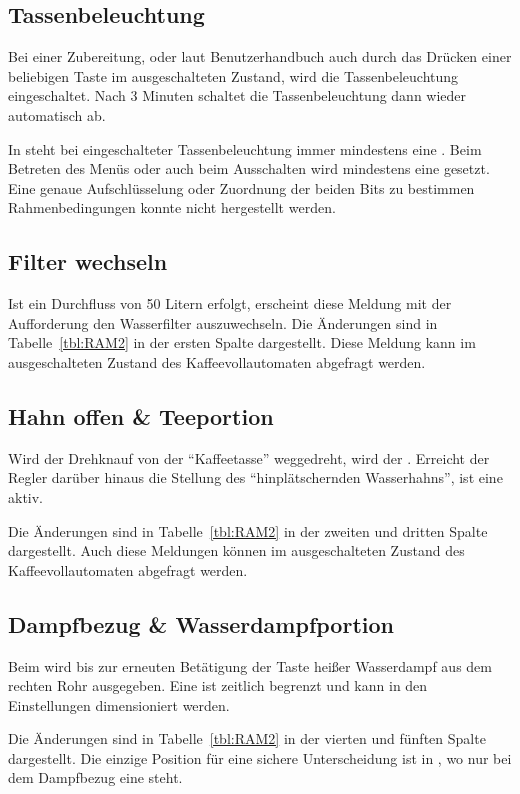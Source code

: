 \subsection{Tassenbeleuchtung}
Bei einer Zubereitung, oder laut Benutzerhandbuch auch durch das Drücken einer beliebigen Taste im ausgeschalteten Zustand, wird die Tassenbeleuchtung eingeschaltet.
Nach 3 Minuten schaltet die Tassenbeleuchtung dann wieder automatisch ab.

In  steht bei eingeschalteter Tassenbeleuchtung immer mindestens eine .
Beim Betreten des Menüs oder auch beim Ausschalten wird mindestens eine  gesetzt.
Eine genaue Aufschlüsselung oder Zuordnung der beiden Bits zu bestimmen Rahmenbedingungen konnte nicht hergestellt werden.

\subsection{Filter wechseln}
Ist ein Durchfluss von 50 Litern erfolgt, erscheint diese Meldung mit der Aufforderung den Wasserfilter auszuwechseln.
Die Änderungen sind in Tabelle~\ref{tbl:RAM2} in der ersten Spalte dargestellt.
Diese Meldung kann im ausgeschalteten Zustand des Kaffeevollautomaten abgefragt werden.

\subsection{Hahn offen \& Teeportion}
Wird der Drehknauf von der "`Kaffeetasse"' weggedreht, wird der .
Erreicht der Regler darüber hinaus die Stellung des "`hinplätschernden Wasserhahns"', ist eine  aktiv.

Die Änderungen sind in Tabelle~\ref{tbl:RAM2} in der zweiten und dritten Spalte dargestellt.
Auch diese Meldungen können im ausgeschalteten Zustand des Kaffeevollautomaten abgefragt werden.

\subsection{Dampfbezug \& Wasserdampfportion}
Beim  wird bis zur erneuten Betätigung der Taste heißer Wasserdampf aus dem rechten Rohr ausgegeben.
Eine  ist zeitlich begrenzt und kann in den Einstellungen dimensioniert werden.

Die Änderungen sind in Tabelle~\ref{tbl:RAM2} in der vierten und fünften Spalte dargestellt.
Die einzige Position für eine sichere Unterscheidung ist in , wo nur bei dem Dampfbezug eine  steht.

